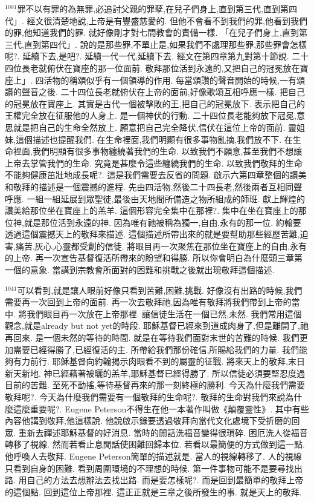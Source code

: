 \documentclass{book}
\begin{document}
$^{1001}$罪不以有罪的為無罪,必追討父親的罪孽,在兒子們身上,直到第三代,直到第四代」.
經文很清楚地說,上帝是有豐盛慈愛的.
但他不會看不到我們的罪,他看到我們的罪,他知道我們的罪.
就好像剛才對七間教會的責備一樣.
「在兒子們身上,直到第三代,直到第四代」.
說的是那些罪,不單止是,如果我們不處理那些罪,那些罪會怎樣呢?.
延續下去,是吧?.
延續一代一代,延續下去.
經文在第四章第九對第十節說.
二十四位長老就俯伏在寶座的那一位面前.
敬拜那位活到永遠的,又把自己的冠冕放在寶座上」.
四活物的稱頌似乎有一個領導的作用.
每當頌讚的聲音開始的時候,一有頌讚的聲音之後.
二十四位長老就俯伏在上帝的面前,好像歌頌互相呼應一樣.
把自己的冠冕放在寶座上.
其實是古代一個被擊敗的王,把自己的冠冕放下.
表示把自己的王權完全放在征服他的人身上.
是一個神伏的行動.
二十四位長老能夠放下冠冕,意思就是把自己的生命全然放上.
願意把自己完全降伏,信伏在這位上帝的面前.
靈姐妹,這個描述也提醒我們.
在生命裡面,我們明顯有很多事物亂摘,我們放不下.
在生命裡面,我們明顯有很多事物纏繞著我們的生命.
以致我們不願意,甚至我們不想讓上帝去掌管我們的生命.
究竟是甚麼令這些纏繞我們的生命.
以致我們敬拜的生命不能夠健康茁壯地成長呢?.
這是我們需要去反省的問題.
啟示六第四章整個的讚美和敬拜的描述是一個震撼的進程.
先由四活物,然後二十四長老,然後兩者互相同聲呼應.
一組一組延展到眾聖徒,最後由天地間所備造之物所組成的師班.
獻上輝煌的讚美給那位坐在寶座上的羔羊.
這個形容完全集中在那裡?.
集中在坐在寶座上的那位神,就是那位活到永遠的神.
因為唯有祂被稱為獨一,自由,永有的那一位.
約翰要透過這個震撼天上的敬拜來描述.
這個描述所帶出來的就是要幫助那些經歷苦難,迫害,痛苦,灰心,心靈都受創的信徒.
將眼目再一次聚焦在那位坐在寶座上的自由,永有的上帝.
再一次宣告基督復活所帶來的盼望和得勝.
所以你會明白為什麼頭三章第一個的意象.
當講到宗教會所面對的困難和挑戰之後就出現敬拜這個描述.

$^{1041}$可以看到,就是讓人眼前好像只看到苦難,困難,挑戰.
好像沒有出路的時候,我們需要再一次回到上帝的面前.
再一次去敬拜祂,因為唯有敬拜將我們帶到上帝的當中.
將我們眼目再一次放在上帝那裡.
讓信徒生活在一個已然,未然.
我們常用這個觀念,就是already but not yet的時段.
耶穌基督已經來到道成肉身了,但是離開了,祂再回來.
是一個未然的等待的時間.
就是在等待我們面對末世的苦難的時候.
我們更加需要已經得勝了,已經復活的主.
所帶給我們那份確信,所賜給我們的力量.
我們能夠有力前行.
耶穌基督向約翰揭示肉眼看不到的屬靈的征戰.
將來天上的敬拜,末日新天新地.
神已經藉著被曬的羔羊,耶穌基督已經得勝了.
所以信徒必須要堅忍度過目前的苦難.
至死不動搖,等待基督再來的那一刻終極的勝利.
今天為什麼我們需要敬拜呢?.
今天為什麼我們需要有一個敬拜的生命呢?.
敬拜的生命對我們來說為什麼這麼重要呢?.
Eugene Peterson不得生在他一本著作叫做《顛覆靈性》.
其中有些內容他講到敬拜,他這樣說.
他說啟示錄要透過敬拜向當代文化處境下受折磨的回眾.
重新去禪述耶穌基督的好消息.
當時的閒話洗福音變得很瑣碎.
困厄洗人從福音轉移了視線.
然而若看止息閒話使困難回歸本位.
若看以最簡便的方式做到這一點.
他呼喚人去敬拜.
Eugene Peterson簡單的描述就是.
當人的視線轉移了.
人的視線只看到自身的困難.
看到周圍環境的不理想的時候.
第一件事物可能不是要尋找出路.
用自己的方法去想辦法去找出路.
而是要怎樣呢?.
而是回到最簡單的敬拜上帝的這個點.
回到這位上帝那裡.
這正正就是三章之後所發生的事.
就是天上的敬拜.
\end{document}
